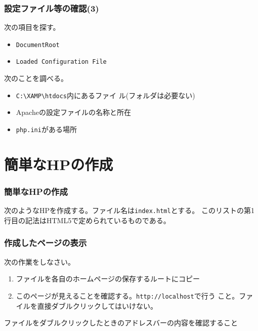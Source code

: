 \begin{frame}[containsverbatim]
 \frametitle{設定ファイル等の確認(3)}
 次の項目を探す。
 \begin{itemize}
  \item \texttt{Document\textunderscore Root}
 \item \texttt{Loaded Configuration File}
 \end{itemize}
 次のことを調べる。
 \begin{itemize}
  \item \texttt{C:\textbackslash XAMP\textbackslash htdocs}内にあるファイ
       ル(フォルダは必要ない)
  \item Apacheの設定ファイルの名称と所在
  \item \texttt{php.ini}がある場所
 \end{itemize}
\end{frame}
\section{簡単なHPの作成}
\begin{frame}[containsverbatim]
 \frametitle{簡単なHPの作成}
 次のようなHPを作成する。ファイル名は\texttt{index.html}とする。
このリストの第1行目の記法はHTML5で定められているものである。
\end{frame}
\begin{frame}[containsverbatim]
 \frametitle{作成したページの表示}
次の作業をしなさい。
\begin{enumerate}
 \item ファイルを各自のホームページの保存するルートにコピー
 \item このページが見えることを確認する。\texttt{http://localhost}で行う
       こと。ファイルを直接ダブルクリックしてはいけない。
\end{enumerate}
 ファイルをダブルクリックしたときのアドレスバーの内容を確認すること
\end{frame}
